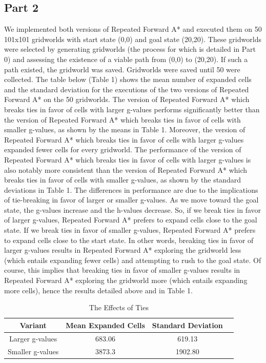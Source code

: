 \documentclass{article}
\begin{document}
\subsection*{Part 2}
We implemented both versions of Repeated Forward A* and executed them on 50 101x101 gridworlds with start state (0,0) and goal state (20,20). These gridworlds were selected by generating gridworlds (the process for which is detailed in Part 0) and assessing the existence of a viable path from (0,0) to (20,20). If such a path existed, the gridworld was saved. Gridworlds were saved until 50 were collected. The table below (Table 1) shows the mean number of expanded cells and the standard deviation for the executions of the two versions of Repeated Forward A* on the 50 gridworlds. The version of Repeated Forward A* which breaks ties in favor of cells with larger g-values performs significantly better than the version of Repeated Forward A* which breaks ties in favor of cells with smaller g-values, as shown by the means in Table 1. Moreover, the version of Repeated Forward A* which breaks ties in favor of cells with larger g-values expanded fewer cells for every gridworld. The performance of the version of Repeated Forward A* which breaks ties in favor of cells with larger g-values is also notably more consistent than the version of Repeated Forward A* which breaks ties in favor of cells with smaller g-values, as shown by the standard deviations in Table 1. The differences in performance are due to the implications of tie-breaking in favor of larger or smaller g-values. As we move toward the goal state, the g-values increase and the h-values decrease. So, if we break ties in favor of larger g-values, Repeated Forward A* prefers to expand cells close to the goal state. If we break ties in favor of smaller g-values, Repeated Forward A* prefers to expand cells close to the start state. In other words, breaking ties in favor of larger g-values results in Repeated Forward A* exploring the gridworld less (which entails expanding fewer cells) and attempting to rush to the goal state. Of course, this implies that breaking ties in favor of smaller g-values results in Repeated Forward A* exploring the gridworld more (which entails expanding more cells), hence the results detailed above and in Table 1.\\ 

\begin{table}[!h]
    \centering
    \small
    \begin{tabular}{cccc}
        \hline
         Variant & Mean Expanded Cells & Standard Deviation\\
         \hline
         Larger g-values & 683.06 & 619.13\\
         Smaller g-values & 3873.3 & 1902.80\\
        \hline
    \end{tabular}
    \caption{The Effects of Ties}
    \label{tab:my_label}
\end{table}
\end{document}
